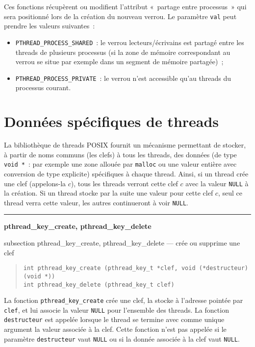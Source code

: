 \documentclass [twoside] {report}
\newcommand {\primitive} [1]
    {
	{\large \bf #1}
	\addcontentsline {toc} {subsection} {#1}
    }
\newcommand {\separation}
    {
	\vspace {7mm}
	\nopagebreak
	\hrule
    }
\begin{document}
Ces fonctions récupèrent ou modifient l'attribut «~partage entre
processus~» qui sera positionné lors de la création du nouveau
verrou. Le paramètre \texttt {val} peut prendre les valeurs suivantes~:

\begin {itemize}
    \item \verb|PTHREAD_PROCESS_SHARED|~: le verrou lecteurs/écrivains
	est partagé entre les threads de plusieurs processus (si la zone
	de mémoire correspondant au verrou se situe par exemple dans un
	segment de mémoire partagée)~;
    \item \verb|PTHREAD_PROCESS_PRIVATE|~: le verrou n'est accessible
	qu'au threads du processus courant.
\end {itemize}


\section {Données spécifiques de threads}

La bibliothèque de threads POSIX fournit un mécanisme permettant de
stocker, à partir de noms communs (les clefs) à tous les threads,
des données (de type \verb|void *|~: par exemple une zone allouée
par \texttt {malloc} ou une valeur entière avec conversion de type
explicite) spécifiques à chaque thread. Ainsi, si un thread crée une
clef (appelons-la $c$), tous les threads verront cette clef $c$ avec
la valeur \texttt {NULL} à la création.  Si un thread stocke par la
suite une valeur pour cette clef $c$, seul ce thread verra cette valeur,
les autres continueront à voir \texttt {NULL}.


\separation
\primitive {pthread\_key\_create, pthread\_key\_delete} --- crée ou supprime une clef

\begin {quote}
\begin {verbatim}
int pthread_key_create (pthread_key_t *clef, void (*destructeur) (void *))
int pthread_key_delete (pthread_key_t clef)
\end{verbatim}
\end {quote}

La fonction \verb|pthread_key_create| crée une clef, la stocke à
l'adresse pointée par \texttt {clef}, et lui associe la valeur \texttt
{NULL} pour l'ensemble des threads. La fonction \texttt {destructeur}
est appelée lorsque le thread se termine avec comme unique argument la
valeur associée à la clef. Cette fonction n'est pas appelée si le
paramètre \texttt {destructeur} vaut \texttt {NULL} ou si la donnée
associée à la clef vaut \texttt {NULL}.
\end{document}
